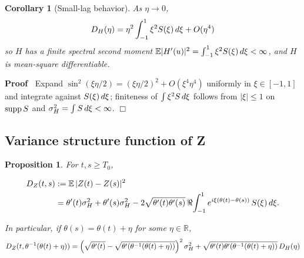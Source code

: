 \documentclass{article}
\newcommand{\assign}{:=}
\newenvironment{proof}{\noindent\textbf{Proof\ }}{\hspace*{\fill}$\Box$\medskip}
\newtheorem{corollary}{Corollary}
\newtheorem{proposition}{Proposition}
\begin{document}
\begin{corollary}
  [Small-lag behavior]\label{cor:DH-small}As $\eta \to 0$,
  \begin{equation}
    D_H (\eta) = \eta^2  \int_{- 1}^1 \xi^2 S (\xi)  \hspace{0.17em} d \xi + O
    (\eta^4)
  \end{equation}
  so $H$ has a finite spectral second moment $\mathbb{E} |H' (u) |^2 = \int_{-
  1}^1 \xi^2 S (\xi)  \hspace{0.17em} d \xi < \infty$, and $H$ is mean-square
  differentiable.
\end{corollary}

\begin{proof}
  Expand $\sin^2 (\xi \eta / 2) = (\xi \eta / 2)^2 + O (\xi^4 \eta^4)$
  uniformly in $\xi \in [- 1, 1]$ and integrate against $S (\xi) 
  \hspace{0.17em} d \xi$; finiteness of $\int \xi^2 S \hspace{0.17em} d \xi$
  follows from $| \xi | \le 1$ on $\mathrm{supp} \hspace{0.17em} S$ and
  $\sigma_H^2 = \int S \hspace{0.17em} d \xi < \infty$.
\end{proof}

\subsection{Variance structure function of Z}

\begin{proposition}
  \label{prop:DZ}For $t, s \ge T_0$,
  
  \begin{align}
    D_Z (t, s) & \assign \mathbb{E} \hspace{0.17em} |Z (t) - Z (s) |^2 \\
    & = \theta' (t) \sigma_H^2 + \theta' (s) \sigma_H^2 - 2 \sqrt{\theta' (t)
    \theta' (s)}  \hspace{0.17em} \Re \hspace{-0.17em} \int_{- 1}^1 e^{i \xi
    (\theta (t) - \theta (s))}  \hspace{0.17em} S (\xi)  \hspace{0.17em} d \xi
    .  \label{eq:DZ}
  \end{align}
  
  In particular, if $\theta (s) = \theta (t) + \eta$ for some $\eta \in
  \mathbb{R}$,
  \begin{equation}
    D_Z (t, \theta^{- 1} (\theta (t) + \eta)) = \left( \sqrt{\theta' (t)} -
    \sqrt{\theta' (\theta^{- 1} (\theta (t) + \eta))} \right)^2 \sigma_H^2 +
    \sqrt{\theta' (t) \theta'  (\theta^{- 1} (\theta (t) + \eta))} 
    \hspace{0.17em} D_H (\eta) \label{eq:DZ-split}
  \end{equation}
\end{proposition}
\end{document}
